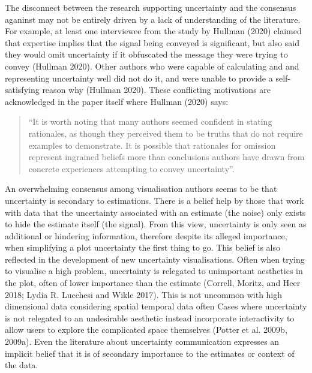 \documentclass[
  letterpaper,
  DIV=11,
  numbers=noendperiod]{scrartcl}
\begin{document}
The disconnect between the research supporting uncertainty and the
consensus aganinst may not be entirely driven by a lack of understanding
of the literature. For example, at least one interviewee from the study
by Hullman (2020) claimed that expertise implies that the signal being
conveyed is significant, but also said they would omit uncertainty if it
obfuscated the message they were trying to convey (Hullman 2020). Other
authors who were capable of calculating and and representing uncertainty
well did not do it, and were unable to provide a self-satisfying reason
why (Hullman 2020). These conflicting motivations are acknowledged in
the paper itself where Hullman (2020) says:

\begin{quote}
``It is worth noting that many authors seemed confident in stating
rationales, as though they perceived them to be truths that do not
require examples to demonstrate. It is possible that rationales for
omission represent ingrained beliefs more than conclusions authors have
drawn from concrete experiences attempting to convey uncertainty''.
\end{quote}

An overwhelming consensus among visualisation authors seems to be that
uncertainty is secondary to estimations. There is a belief help by those
that work with data that the uncertainty associated with an estimate
(the noise) only exists to hide the estimate itself (the signal). From
this view, uncertainty is only seen as additional or hindering
information, therefore despite its alleged importance, when simplifying
a plot uncertainty the first thing to go. This belief is also reflected
in the development of new uncertainty visualisations. Often when trying
to visualise a high problem, uncertainty is relegated to unimportant
aesthetics in the plot, often of lower importance than the estimate
(Correll, Moritz, and Heer 2018; Lydia R. Lucchesi and Wikle 2017). This
is not uncommon with high dimensional data considering spatial temporal
data often Cases where uncertainty is not relegated to an undesirable
aesthetic instead incorporate interactivity to allow users to explore
the complicated space themselves (Potter et al. 2009b, 2009a). Even the
literature about uncertainty communication expresses an implicit belief
that it is of secondary importance to the estimates or context of the
data.
\end{document}
